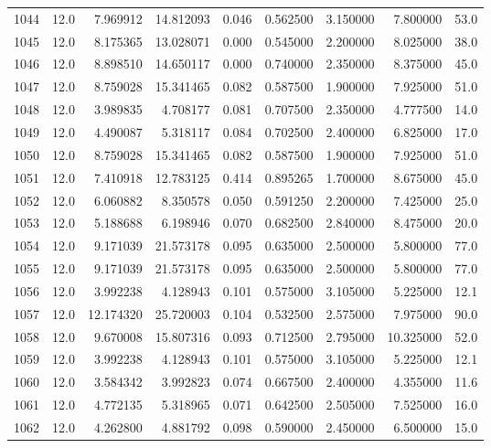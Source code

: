 \begin{tabular}{lrrrrrrrr}
1044 &   12.0 &   7.969912 &  14.812093 &  0.046 &  0.562500 &  3.150000 &   7.800000 &   53.0 \\
1045 &   12.0 &   8.175365 &  13.028071 &  0.000 &  0.545000 &  2.200000 &   8.025000 &   38.0 \\
1046 &   12.0 &   8.898510 &  14.650117 &  0.000 &  0.740000 &  2.350000 &   8.375000 &   45.0 \\
1047 &   12.0 &   8.759028 &  15.341465 &  0.082 &  0.587500 &  1.900000 &   7.925000 &   51.0 \\
1048 &   12.0 &   3.989835 &   4.708177 &  0.081 &  0.707500 &  2.350000 &   4.777500 &   14.0 \\
1049 &   12.0 &   4.490087 &   5.318117 &  0.084 &  0.702500 &  2.400000 &   6.825000 &   17.0 \\
1050 &   12.0 &   8.759028 &  15.341465 &  0.082 &  0.587500 &  1.900000 &   7.925000 &   51.0 \\
1051 &   12.0 &   7.410918 &  12.783125 &  0.414 &  0.895265 &  1.700000 &   8.675000 &   45.0 \\
1052 &   12.0 &   6.060882 &   8.350578 &  0.050 &  0.591250 &  2.200000 &   7.425000 &   25.0 \\
1053 &   12.0 &   5.188688 &   6.198946 &  0.070 &  0.682500 &  2.840000 &   8.475000 &   20.0 \\
1054 &   12.0 &   9.171039 &  21.573178 &  0.095 &  0.635000 &  2.500000 &   5.800000 &   77.0 \\
1055 &   12.0 &   9.171039 &  21.573178 &  0.095 &  0.635000 &  2.500000 &   5.800000 &   77.0 \\
1056 &   12.0 &   3.992238 &   4.128943 &  0.101 &  0.575000 &  3.105000 &   5.225000 &   12.1 \\
1057 &   12.0 &  12.174320 &  25.720003 &  0.104 &  0.532500 &  2.575000 &   7.975000 &   90.0 \\
1058 &   12.0 &   9.670008 &  15.807316 &  0.093 &  0.712500 &  2.795000 &  10.325000 &   52.0 \\
1059 &   12.0 &   3.992238 &   4.128943 &  0.101 &  0.575000 &  3.105000 &   5.225000 &   12.1 \\
1060 &   12.0 &   3.584342 &   3.992823 &  0.074 &  0.667500 &  2.400000 &   4.355000 &   11.6 \\
1061 &   12.0 &   4.772135 &   5.318965 &  0.071 &  0.642500 &  2.505000 &   7.525000 &   16.0 \\
1062 &   12.0 &   4.262800 &   4.881792 &  0.098 &  0.590000 &  2.450000 &   6.500000 &   15.0 \\

\end{tabular}
